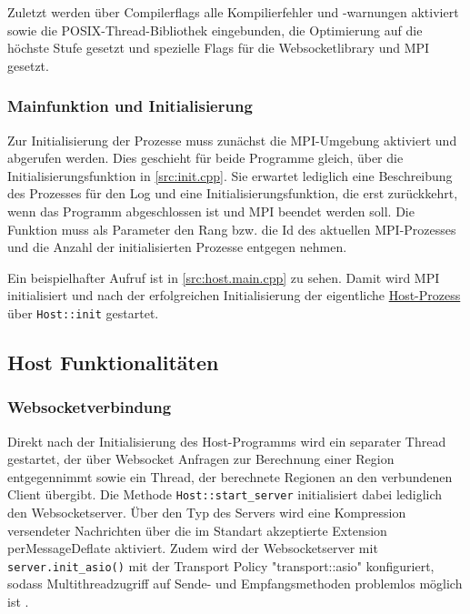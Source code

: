 Zuletzt werden über Compilerflags alle Kompilierfehler und -warnungen aktiviert sowie die POSIX-Thread-Bibliothek eingebunden,
die Optimierung auf die höchste Stufe gesetzt und spezielle Flags für die Websocketlibrary und MPI gesetzt.

\subsubsection{Mainfunktion und Initialisierung}

Zur Initialisierung der Prozesse muss zunächst die MPI-Umgebung aktiviert und abgerufen werden.
Dies geschieht für beide Programme gleich, über die Initialisierungsfunktion in \autoref{src:init.cpp}.
Sie erwartet lediglich eine Beschreibung des Prozesses für den Log und eine Initialisierungsfunktion,
die erst zurückkehrt, wenn das Programm abgeschlossen ist und MPI beendet werden soll.
Die Funktion muss als Parameter den Rang bzw. die Id des aktuellen MPI-Prozesses und die Anzahl der initialisierten
Prozesse entgegen nehmen.

Ein beispielhafter Aufruf ist in \autoref{src:host.main.cpp} zu sehen. Damit wird MPI initialisiert und nach der
erfolgreichen Initialisierung der eigentliche \hyperref[cls:Host]{Host-Prozess} über \verb|Host::init| gestartet.

\begin{figure}[h]
	
\end{figure}

\begin{figure}
	
\end{figure}

\subsection{Host Funktionalitäten}\label{cls:Host}

\subsubsection{Websocketverbindung}

Direkt nach der Initialisierung des Host-Programms wird ein separater Thread gestartet, der über Websocket
Anfragen zur Berechnung einer Region entgegennimmt sowie ein Thread, der berechnete Regionen an den verbundenen Client übergibt.
Die Methode \verb|Host::start_server| initialisiert dabei lediglich den Websocketserver.
Über den Typ des Servers wird eine Kompression versendeter Nachrichten über die im Standart akzeptierte Extension perMessageDeflate aktiviert.
Zudem wird der Websocketserver mit \verb|server.init_asio()| mit der Transport Policy "transport::asio"
konfiguriert, sodass Multithreadzugriff auf Sende- und Empfangsmethoden problemlos möglich ist \cite{websocketppManual}.

